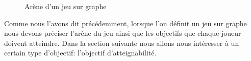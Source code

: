 \begin{exemple}
\begin{figure}[ht!]
		\caption{Arène d'un jeu sur graphe}
		\label{ex:jeuSurGraphe}
	\end{figure}
\end{exemple}

Comme nous l'avons dit précédemment, lorsque l'on définit un jeu sur graphe nous devons préciser l'arène du jeu ainsi que les objectifs que chaque joueur doivent atteindre. Dans la section suivante nous allons nous intéresser à un certain type d'objectif: l'objectif d'atteignabilité.
